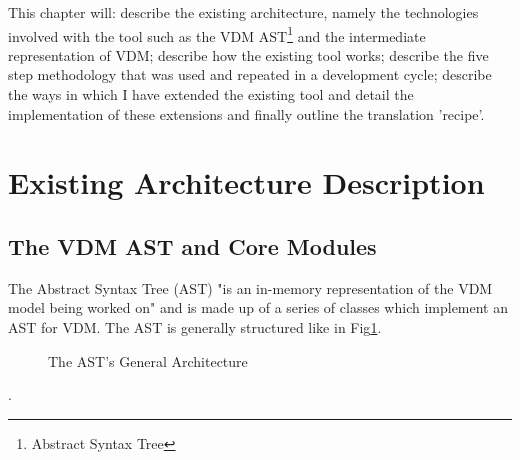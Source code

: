 This chapter will: describe the existing architecture, namely the technologies involved with the tool such as the VDM AST\footnote{Abstract Syntax Tree} and the intermediate representation of VDM; describe how the existing tool works; describe the five step methodology that was used and repeated in a development cycle; describe the ways in which I have extended the existing tool and detail the implementation of these extensions and finally outline the translation 'recipe'.
\hfill\break
\section{Existing Architecture Description} \label{ead}
\subsection{The VDM AST and Core Modules}
The Abstract Syntax Tree (AST) "is an in-memory representation of the VDM model being worked on"\parencite{OvertureWikiArchitectureDescription} and is made up of a series of classes which implement an AST for VDM. The AST is generally structured like in Fig\ref{fig:AST General Architecture}.
\begin{figure}
        \caption{\label{fig:AST General Architecture} The AST's General Architecture \parencite{vdmwikiast}}
      \end{figure}.

